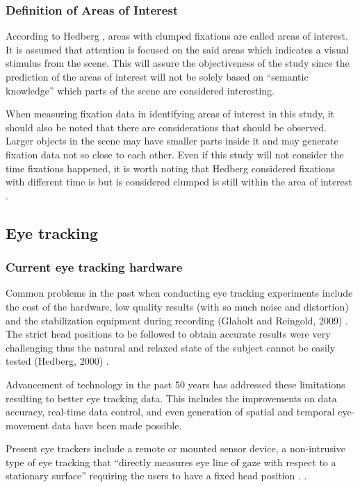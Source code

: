 \documentclass[journal]{./IEEE/IEEEtran}
\begin{document}
\subsubsection{Definition of Areas of Interest} \leavevmode


According to Hedberg  \cite{hedberg00}, areas with clumped fixations are called areas of interest. It is assumed that attention is focused on the said areas which indicates a visual stimulus from the scene. This will assure the objectiveness of the study since the prediction of the areas of interest will not be solely based on “semantic knowledge” which parts of the scene are considered interesting. 

When measuring fixation data in identifying areas of interest in this study, it should also be noted that there are considerations that should be observed. Larger objects in the scene may have smaller parts inside it and may generate fixation data not so close to each other. Even if this study will not consider the time fixations happened, it is worth noting that Hedberg  considered fixations with different time is but is considered clumped is still within the area of interest \cite{hedberg00}.


\subsection{Eye tracking} 

\subsubsection{Current eye tracking hardware} \leavevmode

Common problems in the past when conducting eye tracking experiments include the cost of the hardware, low quality results (with so much noise and distortion) and the stabilization equipment during recording (Glaholt and Reingold, 2009) \cite {glaholt_reingold_2009}. The strict head positions to be followed to obtain accurate results were very challenging thus the natural and relaxed state of the subject cannot be easily tested (Hedberg, 2000) \cite {hedberg00}. 

Advancement of technology in the past 50 years has addressed these limitations resulting to better eye tracking data. This includes the improvements on data accuracy, real-time data control, and even generation of spatial and temporal eye-movement data have been made possible. 

Present eye trackers include a remote or mounted sensor device, a non-intrusive type of eye tracking that  “directly measures eye line of gaze with respect to a stationary surface” requiring the users to have a fixed head position \cite {choosing_an_eye_trackingSB}.
. 
\end{document}
